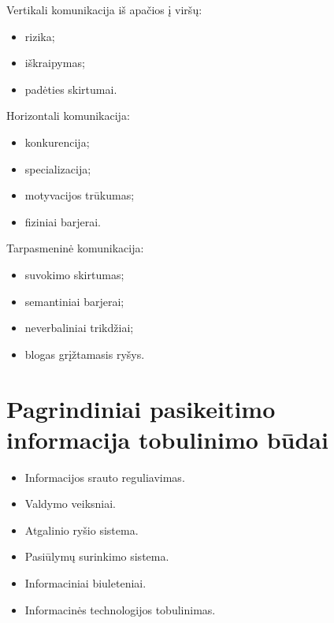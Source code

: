Vertikali komunikacija iš apačios į viršų:
\begin{itemize}
  \item rizika;
  \item iškraipymas;
  \item padėties skirtumai.
\end{itemize}

Horizontali komunikacija:
\begin{itemize}
  \item konkurencija;
  \item specializacija;
  \item motyvacijos trūkumas;
  \item fiziniai barjerai.
\end{itemize}

Tarpasmeninė komunikacija:
\begin{itemize}
  \item suvokimo skirtumas;
  \item semantiniai barjerai;
  \item neverbaliniai trikdžiai;
  \item blogas grįžtamasis ryšys.
\end{itemize}

\section{Pagrindiniai pasikeitimo informacija tobulinimo būdai}

\begin{itemize}
  \item Informacijos srauto reguliavimas.
  \item Valdymo veiksniai.
  \item Atgalinio ryšio sistema.
  \item Pasiūlymų surinkimo sistema.
  \item Informaciniai biuleteniai.
  \item Informacinės technologijos tobulinimas.
\end{itemize}
